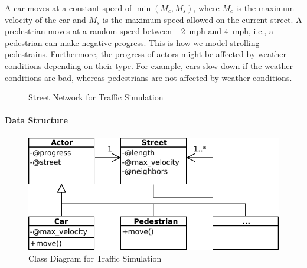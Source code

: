 \documentclass[preprint]{sigplanconf}
\begin{document}
A car moves at a constant speed of $\min(M_c, M_s)$, where $M_c$ is the maximum velocity of the car and $M_s$ is the maximum speed allowed on the current street. A predestrian moves at a random speed between $-2$~mph and $4$~mph, i.e., a pedestrian can make negative progress. This is how we model strolling pedestrains. Furthermore, the progress of actors might be affected by weather conditions depending on their type. For example, cars slow down if the weather conditions are bad, whereas pedestrians are not affected by weather conditions.

\begin{figure}[!htp]
    \centering
    
    \caption{Street Network for Traffic Simulation}
    \label{fig:running_example}%
\end{figure}

\paragraph{Data Structure}
\begin{figure}[!htp]
    \centering
    \includegraphics[width=0.8\columnwidth]{class_diagram_running_ex.pdf}
    \caption{Class Diagram for Traffic Simulation}
    \label{fig:running_example_classes}
\end{figure}
\end{document}

